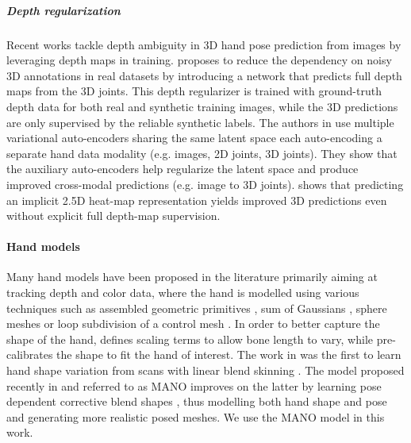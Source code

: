 \documentclass[10pt,twocolumn,letterpaper]{article}
\begin{document}
\subparagraph{Depth regularization}
\vspace{-10pt}
Recent works tackle depth ambiguity in 3D hand pose prediction from images by leveraging depth maps in training. \cite{cai2018weakly} proposes to reduce the dependency on noisy 3D annotations in real datasets by introducing a network that predicts full depth maps from the 3D joints. This depth regularizer is trained with ground-truth depth data for both real and synthetic training images, while the 3D predictions are only supervised by the reliable synthetic labels. The authors in \cite{spurr2018cross} use multiple variational auto-encoders sharing the same latent space each auto-encoding a separate hand data modality (e.g. images, 2D joints, 3D joints). They show that the auxiliary auto-encoders help regularize the latent space and produce improved cross-modal predictions (e.g. image to 3D joints). \cite{iqbal2018hand} shows that predicting an implicit 2.5D heat-map representation yields improved 3D predictions even without explicit full depth-map supervision. 

\paragraph{Hand models}
\vspace{-10pt}
Many hand models have been proposed in the literature primarily aiming at tracking depth and color data, where the hand is modelled using various techniques such as assembled geometric primitives \cite{oikonomidis2011efficient}, sum of Gaussians \cite{ellipsoidtracker_3dv2014}, sphere meshes \cite{tkach2016sphere} or loop subdivision of a control mesh \cite{khamis2015learning}. In order to better capture the shape of the hand,  \cite{oikonomidis2011efficient} defines scaling terms to allow bone length to vary, while \cite{taylor2014user} pre-calibrates the shape to fit the hand of interest. The work in \cite{khamis2015learning} was the first to learn hand shape variation from scans with linear blend skinning \cite{Kavan:2005:SBS:1053427.1053429}. The model proposed recently in \cite{romero2017embodied} and referred to as MANO improves on the latter by learning pose dependent corrective blend shapes \cite{SMPL:2015}, thus modelling both hand shape and pose and generating more realistic posed meshes. We use the MANO \cite{romero2017embodied} model in this work.    
\end{document}
